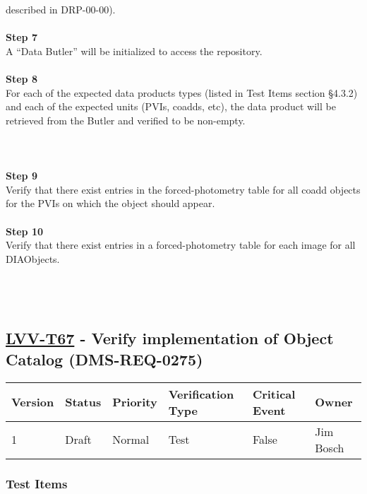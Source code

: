 described in DRP-00-00).\\
~\\
\textbf{Step 7}\\
A ``Data Butler'' will be initialized to access the repository.\\
~\\
\textbf{Step 8}\\
For each of the expected data products types (listed in Test Items
section §4.3.2) and each of the expected units (PVIs, coadds, etc), the
data product will be retrieved from the Butler and verified to be
non-empty.\\
~\\
~\\
~\\
\textbf{Step 9}\\
Verify that there exist entries in the forced-photometry table for all
coadd objects for the PVIs on which the object should appear.\\
~\\
\textbf{Step 10}\\
Verify that there exist entries in a forced-photometry table for each
image for all DIAObjects.\\
~\\
~\\
~\\

\hypertarget{lvv-t67---verify-implementation-of-object-catalog-dms-req-0275}{%
\subsection{\texorpdfstring{\href{https://jira.lsstcorp.org/secure/Tests.jspa\#/testCase/LVV-T67}{LVV-T67}
- Verify implementation of Object Catalog
(DMS-REQ-0275)}{LVV-T67 - Verify implementation of Object Catalog (DMS-REQ-0275)}}\label{lvv-t67---verify-implementation-of-object-catalog-dms-req-0275}}

\begin{longtable}[]{@{}llllll@{}}
\toprule
Version & Status & Priority & Verification Type & Critical Event &
Owner\tabularnewline
\midrule
\endhead
1 & Draft & Normal & Test & False & Jim Bosch\tabularnewline
\bottomrule
\end{longtable}

\hypertarget{test-items-156}{%
\subsubsection{Test Items}\label{test-items-156}}

